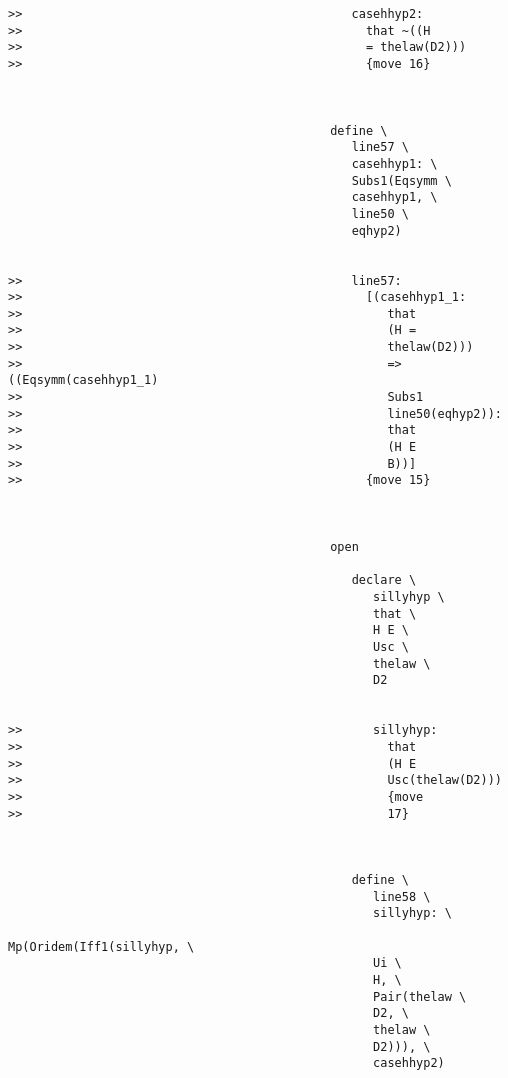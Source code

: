 \documentclass[12pt]{article}
\begin{document}
\begin{verbatim}
>>                                              casehhyp2:
>>                                                that ~((H
>>                                                = thelaw(D2)))
>>                                                {move 16}



                                             define \
                                                line57 \
                                                casehhyp1: \
                                                Subs1(Eqsymm \
                                                casehhyp1, \
                                                line50 \
                                                eqhyp2)


>>                                              line57:
>>                                                [(casehhyp1_1:
>>                                                   that
>>                                                   (H =
>>                                                   thelaw(D2)))
>>                                                   => ((Eqsymm(casehhyp1_1)
>>                                                   Subs1
>>                                                   line50(eqhyp2)):
>>                                                   that
>>                                                   (H E
>>                                                   B))]
>>                                                {move 15}



                                             open

                                                declare \
                                                   sillyhyp \
                                                   that \
                                                   H E \
                                                   Usc \
                                                   thelaw \
                                                   D2


>>                                                 sillyhyp:
>>                                                   that
>>                                                   (H E
>>                                                   Usc(thelaw(D2)))
>>                                                   {move
>>                                                   17}



                                                define \
                                                   line58 \
                                                   sillyhyp: \
                                                   Mp(Oridem(Iff1(sillyhyp, \
                                                   Ui \
                                                   H, \
                                                   Pair(thelaw \
                                                   D2, \
                                                   thelaw \
                                                   D2))), \
                                                   casehhyp2)



\end{verbatim}
\end{document}
